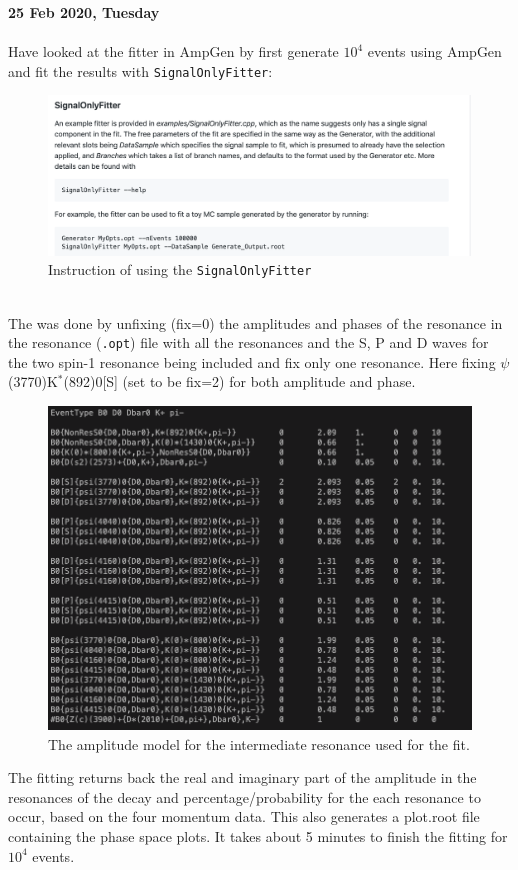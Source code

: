 \clearpage
\noindent\textbf{25 Feb 2020, Tuesday}
\\
\\
Have looked at the fitter in AmpGen by first generate $10^4$ events using AmpGen and fit the results with \texttt{SignalOnlyFitter}:
\begin{figure}[h]
\center
\includegraphics*[width=0.86\linewidth]{amplitude_fit/SignalOnlyFitter}
\caption{Instruction of using the \texttt{SignalOnlyFitter}}
\label{SignalOnlyFitter}
\end{figure}
\\
\label{aa_test}
The was done by unfixing (fix=0) the amplitudes and phases of the resonance in the resonance (\texttt{.opt}) file with all the resonances and the S, P and D waves for the two spin-1 resonance being included and fix only one resonance. Here fixing $\psi$(3770)K$^*$(892)0[S] (set to be fix=2) for both amplitude and phase.
\begin{figure}[h]
\center
\includegraphics*[width=0.76\linewidth]{amplitude_fit/resonance_file}
\caption{The amplitude model for the intermediate resonance used for the fit.}
\label{resonance_file}
\end{figure}
\clearpage
\noindent The fitting returns back the real and imaginary part of the amplitude in the resonances of the decay and percentage/probability for the each resonance to occur, based on the four momentum data. This also generates a plot.root file containing the phase space plots. It takes about 5 minutes to finish the fitting for $10^4$ events.

